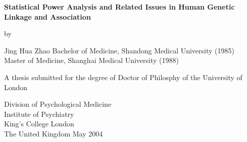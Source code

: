 \documentclass[11pt,a4paper]{iopthsis}
\begin{document}
\thispagestyle{empty}
\begin{center}
{
\vskip 4cm
\Large\bf
Statistical Power Analysis and Related Issues
in Human Genetic Linkage and Association
}

\vskip 2cm

{\large by}

\vskip 1cm

{
\Large
Jing Hua Zhao
}
\large\vskip 0.5cm
Bachelor of Medicine, Shandong Medical University (1985)\\
Master of Medicine, Shanghai Medical University (1988)\\

\vskip 1cm

{\large
A thesis submitted for the degree of Doctor of Philosphy of the University of
London}

\vskip 3.5cm

{
\Large
Division of Psychological Medicine\\
Institute of Psychiatry\\
King's College London\\ \vskip 0.3cm
The United Kingdom
\vskip 1cm
{\large May 2004}
}
\end{center}
\end{document}
